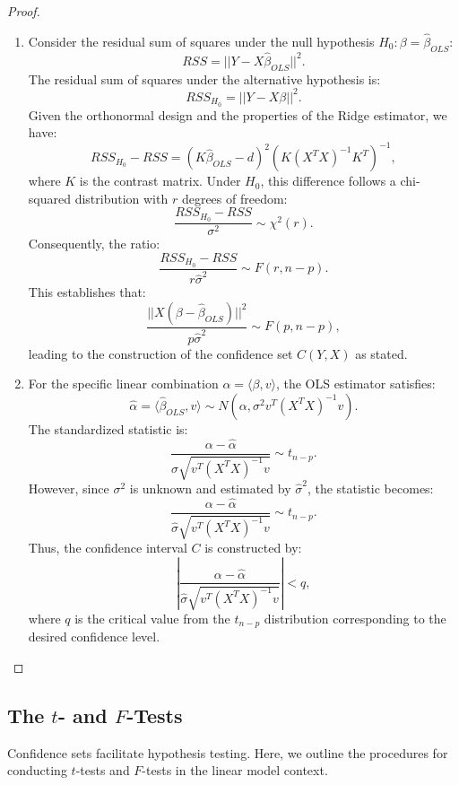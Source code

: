 \documentclass[open=any, 11pt,paper=A4]{scrreprt}
\begin{document}
\begin{proof}
\begin{enumerate}
    \item 
    Consider the residual sum of squares under the null hypothesis \(H_0: \beta = \hat{\beta}_{OLS}\):
    \[
    RSS = ||Y - X\hat{\beta}_{OLS}||^2.
    \]
    The residual sum of squares under the alternative hypothesis is:
    \[
    RSS_{H_0} = ||Y - X\beta||^2.
    \]
    Given the orthonormal design and the properties of the Ridge estimator, we have:
    \[
    RSS_{H_0} - RSS = (K \hat{\beta}_{OLS} - d)^2 (K (X^TX)^{-1} K^T)^{-1},
    \]
    where \(K\) is the contrast matrix. Under \(H_0\), this difference follows a chi-squared distribution with \(r\) degrees of freedom:
    \[
    \frac{RSS_{H_0} - RSS}{\sigma^2} \sim \chi^2(r).
    \]
    Consequently, the ratio:
    \[
    \frac{RSS_{H_0} - RSS}{r \hat{\sigma}^2} \sim F(r, n - p).
    \]
    This establishes that:
    \[
    \frac{||X (\beta - \hat{\beta}_{OLS})||^2}{p \hat{\sigma}^2} \sim F(p, n - p),
    \]
    leading to the construction of the confidence set \(C(Y, X)\) as stated.

    \item 
    For the specific linear combination \(\alpha = \langle \beta, v \rangle\), the OLS estimator satisfies:
    \[
    \hat{\alpha} = \langle \hat{\beta}_{OLS}, v \rangle \sim N\left(\alpha, \sigma^2 v^T (X^TX)^{-1} v \right).
    \]
    The standardized statistic is:
    \[
    \frac{\alpha - \hat{\alpha}}{\sigma \sqrt{v^T (X^TX)^{-1} v}} \sim t_{n - p}.
    \]
    However, since \(\sigma^2\) is unknown and estimated by \(\hat{\sigma}^2\), the statistic becomes:
    \[
    \frac{\alpha - \hat{\alpha}}{\hat{\sigma} \sqrt{v^T (X^TX)^{-1} v}} \sim t_{n - p}.
    \]
    Thus, the confidence interval \(C\) is constructed by:
    \[
    \left| \frac{\alpha - \hat{\alpha}}{\hat{\sigma} \sqrt{v^T (X^TX)^{-1} v}} \right| < q,
    \]
    where \(q\) is the critical value from the \(t_{n - p}\) distribution corresponding to the desired confidence level.
\end{enumerate}
\end{proof}

\subsection{The \(t\)- and \(F\)-Tests}

Confidence sets facilitate hypothesis testing. Here, we outline the procedures for conducting \(t\)-tests and \(F\)-tests in the linear model context.
\end{document}
